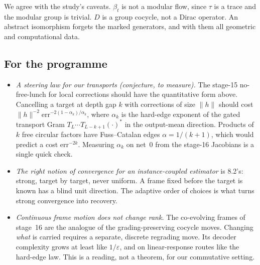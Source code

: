 We agree with the study's caveats. $\beta_t$ is not a modular flow, since $\tau$ is a trace and the modular group is trivial. $D$ is a group cocycle,
not a Dirac operator. An abstract isomorphism forgets the marked generators, and with them all geometric and computational data.

\subsection{For the programme}
\begin{itemize}[leftmargin=*]
\item \emph{A steering law for our transports (conjecture, to measure).} The stage-15 no-free-lunch for local corrections should have the quantitative
form above. Cancelling a target at depth gap $k$ with corrections of size $\|h\|$ should cost $\|h\|^{-2}\mathrm{err}^{-2(1-\alpha_k)/\alpha_k}$, where $\alpha_k$ is the
hard-edge exponent of the gated transport Gram $T_L\cdots T_{L-k+1}(\cdot)^*$ in the output-mean direction. Products of $k$ free circular factors have
Fuss--Catalan edges $\alpha=1/(k+1)$, which would predict a cost $\mathrm{err}^{-2k}$. Measuring $\alpha_k$ on net~0 from the stage-16 Jacobians is a single
quick check.
\item \emph{The right notion of convergence for an instance-coupled estimator} is 8.2's: strong, target by target, never uniform. A frame fixed
before the target is known has a blind unit direction. The adaptive order of choices is what turns strong convergence into recovery.
\item \emph{Continuous frame motion does not change rank.} The co-evolving frames of stage~16 are the analogue of the grading-preserving
cocycle moves. Changing \emph{what} is carried requires a separate, discrete regrading move. Its decoder complexity grows at least like
$1/\varepsilon$, and on linear-response routes like the hard-edge law. This is a reading, not a theorem, for our commutative setting.
\end{itemize}
